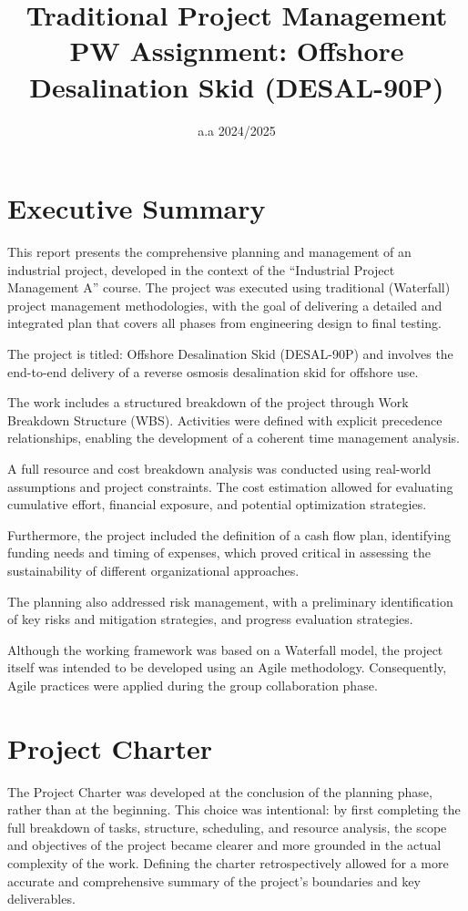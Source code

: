 \documentclass[12pt]{article}
\title{Traditional Project Management PW Assignment: Offshore Desalination Skid (DESAL-90P)}
\author{}
\date{a.a 2024/2025}
\begin{document}
\maketitle

\section{Executive Summary}

This report presents the comprehensive planning and management of an industrial project, developed in the context of the “Industrial Project Management A” course. The project was executed using traditional (Waterfall) project management methodologies, with the goal of delivering a detailed and integrated plan that covers all phases from engineering design to final testing.

The project is titled: Offshore Desalination Skid (DESAL-90P) and involves the end-to-end delivery of a reverse osmosis desalination skid for offshore use.

The work includes a structured breakdown of the project through Work Breakdown Structure (WBS). Activities were defined with explicit precedence relationships, enabling the development of a coherent time management analysis.

A full resource and cost breakdown analysis was conducted using real-world assumptions and project constraints. The cost estimation allowed for evaluating cumulative effort, financial exposure, and potential optimization strategies.

Furthermore, the project included the definition of a cash flow plan, identifying funding needs and timing of expenses, which proved critical in assessing the sustainability of different organizational approaches.

The planning also addressed risk management, with a preliminary identification of key risks and mitigation strategies, and progress evaluation strategies.

Although the working framework was based on a Waterfall model, the project itself was intended to be developed using an Agile methodology. Consequently, Agile practices were applied during the group collaboration phase.

\section{Project Charter}

The Project Charter was developed at the conclusion of the planning phase, rather than at the beginning. This choice was intentional: by first completing the full breakdown of tasks, structure, scheduling, and resource analysis, the scope and objectives of the project became clearer and more grounded in the actual complexity of the work. Defining the charter retrospectively allowed for a more accurate and comprehensive summary of the project’s boundaries and key deliverables.
\end{document}
